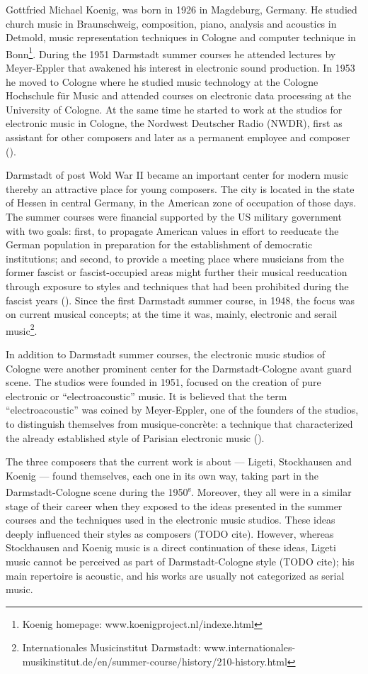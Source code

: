 \documentclass[a4paper,11pt]{article}
\begin{document}
Gottfried Michael Koenig, was born in 1926 in Magdeburg, Germany.
He studied church music in Braunschweig, composition, piano, analysis and acoustics in Detmold, music representation techniques in Cologne and computer technique in Bonn\footnote{Koenig homepage: www.koenigproject.nl/indexe.html}.
During the 1951 Darmstadt summer courses he attended lectures by Meyer-Eppler that awakened his interest in electronic sound production.
In 1953 he moved to Cologne where he studied music technology at the Cologne Hochschule f{\"u}r Music and attended courses on electronic data processing at the University of Cologne.
At the same time he started to work at the studios for electronic music in Cologne, the Nordwest Deutscher Radio (NWDR), first as assistant for other composers and later as a permanent employee and composer (\cite{koenig_grove}).

Darmstadt of post Wold War II became an important center for modern music thereby an attractive place for young composers.
The city is located in the state of Hessen in central Germany, in the American zone of occupation of those days.
The summer courses were financial supported by the US military government with two goals:
first, to propagate American values in effort to reeducate the German population in preparation for the establishment of democratic institutions;
and second, to provide a meeting place where musicians from the former fascist or fascist-occupied areas might further their musical reeducation through exposure to styles and techniques that had been prohibited during the fascist years (\cite{darmstadt_oxford}).
Since the first Darmstadt summer course, in 1948, the focus was on current musical concepts;
at the time it was, mainly, electronic and serail music\footnote{Internationales Musicinstitut Darmstadt: www.internationales-musikinstitut.de/en/summer-course/history/210-history.html}.

In addition to Darmstadt summer courses, the electronic music studios of Cologne were another prominent center for the Darmstadt-Cologne avant guard scene.
The studios were founded in 1951, focused on the creation of pure electronic or ``electroacoustic'' music.
It is believed that the term ``electroacoustic'' was coined by Meyer-Eppler, one of the founders of the studios, to distinguish themselves from musique-concr{\`e}te:
a technique that characterized the already established style of Parisian electronic music (\cite{nwdr}).

The three composers that the current work is about --- Ligeti, Stockhausen and Koenig --- found themselves, each one in its own way, taking part in the Darmstadt-Cologne scene during the 1950\textsuperscript{s}.
Moreover, they all were in a similar stage of their career when they exposed to the ideas presented in the summer courses and the techniques used in the electronic music studios.
These ideas deeply influenced their styles as composers (TODO cite).
However, whereas Stockhausen and Koenig music is a direct continuation of these ideas, Ligeti music cannot be perceived as part of Darmstadt-Cologne style (TODO cite);
his main repertoire is acoustic, and his works are usually not categorized as serial music.
\end{document}
